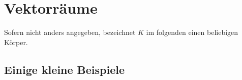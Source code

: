 \chapter{Vektorräume}
Sofern nicht anders angegeben, bezeichnet $K$ im folgenden einen beliebigen Körper.





\section{Einige kleine Beispiele}